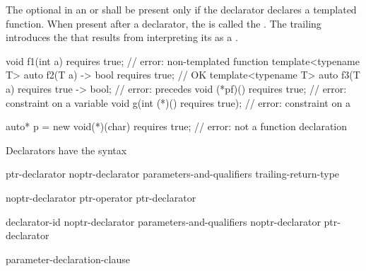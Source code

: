 \pnum
The optional  in an
 or 
shall be present only if the declarator declares a
templated function.
%
%
When present after a declarator, the 
is called the .
The trailing  introduces the
 that results from interpreting
its  as a
.
%
\begin{example}
\begin{codeblock}
void f1(int a) requires true;               // error: non-templated function
template<typename T>
  auto f2(T a) -> bool requires true;       // OK
template<typename T>
  auto f3(T a) requires true -> bool;       // error:  precedes 
void (*pf)() requires true;                 // error: constraint on a variable
void g(int (*)() requires true);            // error: constraint on a 

auto* p = new void(*)(char) requires true;  // error: not a function declaration
\end{codeblock}
\end{example}

\pnum
Declarators have the syntax

\begin{bnf}
\br
    ptr-declarator\br
    noptr-declarator parameters-and-qualifiers trailing-return-type
\end{bnf}

\begin{bnf}
\br
    noptr-declarator\br
    ptr-operator ptr-declarator
\end{bnf}

\begin{bnf}
\br
    declarator-id \br
    noptr-declarator parameters-and-qualifiers\br
    noptr-declarator \terminal{[}  \terminal{]} \br
    \terminal{(} ptr-declarator \terminal{)}
\end{bnf}

\begin{bnf}
\br
    \terminal{(} parameter-declaration-clause \terminal{)} \br
    \bnfindent{}  
\end{bnf}

